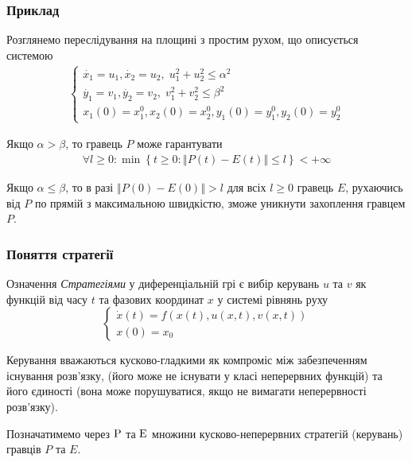 \documentclass[10pt,pdf,aspectratio=169]{beamer}
\renewcommand{\d}[1]{\dot{#1}}
\renewcommand{\l}{\left}
\renewcommand{\r}{\right}
\newcommand{\norm}[1]{\left\Vert #1 \right\Vert}
\begin{document}
    \begin{frame}
        \frametitle{Приклад}
    
        Розглянемо переслідування на площині з простим рухом, що описується системою
        \begin{gather*}
            \begin{cases}
                \d{x_1} = u_1, \d{x_2} = u_2, \; u_1^2 + u_2^2 \leq \alpha^2 \\
                \d{y_1} = v_1, \d{y_2} = v_2, \; v_1^2 + v_2^2 \leq \beta^2 \\
                x_1(0) = x_1^0, x_2(0) = x_2^0, y_1(0) = y_1^0, y_2(0) = y_2^0
            \end{cases}
        \end{gather*}

        Якщо $\alpha > \beta$, то гравець $P$ може гарантувати
        \begin{gather*}
            \forall l \geq 0 : \min \l\{ t \geq 0 : \norm{P(t) - E(t)} \leq l\r\} < +\infty
        \end{gather*}

        Якщо $\alpha \leq \beta$, то в разі $\norm{P(0) - E(0)} > l$ для всіх $l \geq 0$ гравець $E$, рухаючись від $P$ по прямій з максимальною швидкістю,
        зможе уникнути захоплення гравцем $P$.
    \end{frame}
    \begin{frame}
        \frametitle{Поняття стратегії}
    
        \begin{block}{Означення}
            \emph{Стратегіями} у диференціальній грі є вибір керувань $u$ та $v$ як функцій від часу $t$ та
            фазових координат $x$ у системі рівнянь руху
            $$
            \begin{cases}
                \d{x}(t) = {f}(x(t), u(x, t), v(x, t)) \\
                x(0) = x_0
            \end{cases}
            $$
        \end{block}
        Керування вважаються кусково-гладкими як компроміс між забезпеченням існування розв'язку, 
        (його може не існувати у класі неперервних функцій) та його єдиності (вона може порушуватися, якщо не вимагати неперервності розв'язку).

        Позначатимемо через $\rm P$ та $\rm E$ множини кусково-неперервних стратегій (керувань) гравців $P$ та $E$. 
    \end{frame}
\end{document}
